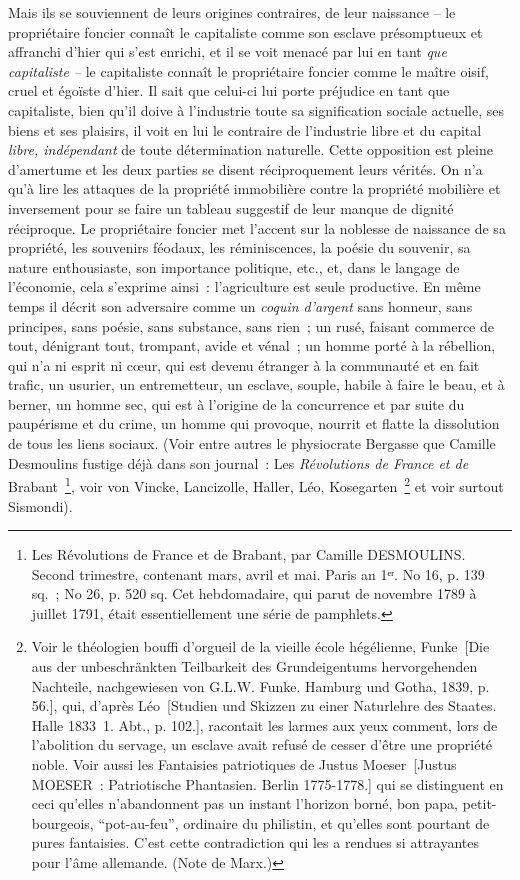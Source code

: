 \documentclass[french,twoside]{book} %
\begin{document}
Mais ils se souviennent de leurs origines contraires, de leur naissance – le propriétaire foncier connaît le capitaliste comme son esclave présomptueux et affranchi d’hier qui s’est enrichi, et il se voit menacé par lui en tant \emph{que capitaliste –} le capitaliste connaît le propriétaire foncier comme le maître oisif, cruel et égoïste d’hier. Il sait que celui-ci lui porte préjudice en tant que capitaliste, bien qu’il doive à l’industrie toute sa signification sociale actuelle, ses biens et ses plaisirs, il voit en lui le contraire de l’industrie libre et du capital \emph{libre, indépendant} de toute détermination naturelle. Cette opposition est pleine d’amertume et les deux parties se disent réciproquement leurs vérités. On n’a qu’à lire les attaques de la propriété immobilière contre la propriété mobilière et inversement pour se faire un tableau suggestif de leur manque de dignité réciproque. Le propriétaire foncier met l’accent sur la noblesse de naissance de sa propriété, les souvenirs féodaux, les réminiscences, la poésie du souvenir, sa nature enthousiaste, son importance politique, etc., et, dans le langage de l’économie, cela s’exprime ainsi : l’agriculture est seule productive. En même temps il décrit son adversaire comme un \emph{coquin d’argent} sans honneur, sans principes, sans poésie, sans substance, sans rien ; un rusé, faisant commerce de tout, dénigrant tout, trompant, avide et vénal ; un homme porté à la rébellion, qui n’a ni esprit ni cœur, qui est devenu étranger à la communauté et en fait trafic, un usurier, un entremetteur, un esclave, souple, habile à faire le beau, et à berner, un homme sec, qui est à l’origine de la concurrence et par suite du paupérisme et du crime, un homme qui provoque, nourrit et flatte la dissolution de tous les liens sociaux. (Voir entre autres le physiocrate Bergasse que Camille Desmoulins fustige déjà dans son journal : Les \emph{Révolutions de France et de} Brabant \footnote{Les Révolutions de France et de Brabant, par Camille DESMOULINS. Second trimestre, contenant mars, avril et mai. Paris an 1ᵉʳ. No 16, p. 139 sq. ; No 26, p. 520 sq. Cet hebdomadaire, qui parut de novembre 1789 à juillet 1791, était essentiellement une série de pamphlets.}, voir von Vincke, Lancizolle, Haller, Léo, Kosegarten \footnote{ \noindent Voir le théologien bouffi d’orgueil de la vieille école hégélienne, Funke [Die aus der unbeschränkten Teilbarkeit des Grundeigentums hervorgehenden Nachteile, nachgewiesen von G.L.W. Funke. Hamburg und Gotha, 1839, p. 56.], qui, d’après Léo [Studien und Skizzen zu einer Naturlehre des Staates. Halle 1833 1. Abt., p. 102.], racontait les larmes aux yeux comment, lors de l’abolition du servage, un esclave avait refusé de cesser d’être une propriété noble. Voir aussi les Fantaisies patriotiques de Justus Moeser [Justus MOESER : Patriotische Phantasien. Berlin 1775-1778.] qui se distinguent en ceci qu’elles n’abandonnent pas un instant l’horizon borné, bon papa, petit-bourgeois, “pot-au-feu”, ordinaire du philistin, et qu’elles sont pourtant de pures fantaisies. C’est cette contradiction qui les a rendues si attrayantes pour l’âme allemande. (Note de Marx.)
 } et voir surtout Sismondi).\par
\end{document}
